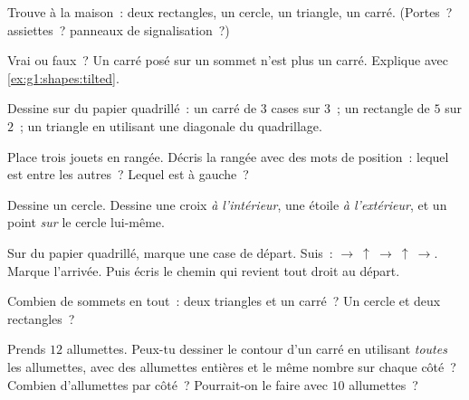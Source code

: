 \begin{exercise}[$\star$]\label{exo:g1:shapes:2}
Trouve à la maison~: deux rectangles, un cercle, un triangle, un
carré. (Portes~? assiettes~? panneaux de signalisation~?)
\end{exercise}

\begin{exercise}[$\star$]\label{exo:g1:shapes:3}
Vrai ou faux~? \guillemotleft{} Un carré posé sur un sommet
n'est plus un carré. \guillemotright{} Explique avec
\cref{ex:g1:shapes:tilted}.
\end{exercise}

\begin{exercise}[$\star$]\label{exo:g1:shapes:4}
Dessine sur du papier quadrillé~: un carré de $3$ cases sur
$3$~; un rectangle de $5$ sur $2$~; un triangle en utilisant une
diagonale du quadrillage.
\end{exercise}

\begin{exercise}[$\star$]\label{exo:g1:shapes:5}
Place trois jouets en rangée. Décris la rangée avec des mots de
position~: lequel est entre les autres~? Lequel est à gauche~?
\end{exercise}

\begin{exercise}[$\star$]\label{exo:g1:shapes:6}
Dessine un cercle. Dessine une croix \emph{à l'intérieur}, une
étoile \emph{à l'extérieur}, et un point \emph{sur} le cercle
lui-même.
\end{exercise}

\begin{exercise}[$\star$]\label{exo:g1:shapes:7}
Sur du papier quadrillé, marque une case de départ. Suis~:
$\to\ \uparrow\ \to\ \uparrow\ \to$. Marque l'arrivée. Puis
écris le chemin qui revient tout droit au départ.
\end{exercise}

\begin{exercise}[$\star$]\label{exo:g1:shapes:8}
Combien de sommets en tout~: deux triangles et un carré~? Un
cercle et deux rectangles~?
\end{exercise}

\begin{exercise}[$\star\star$]\label{exo:g1:shapes:9}
Prends $12$ allumettes. Peux-tu dessiner le contour d'un carré en
utilisant \emph{toutes} les allumettes, avec des allumettes entières
et le même nombre sur chaque côté~? Combien d'allumettes par
côté~? Pourrait-on le faire avec $10$ allumettes~?
\end{exercise}
